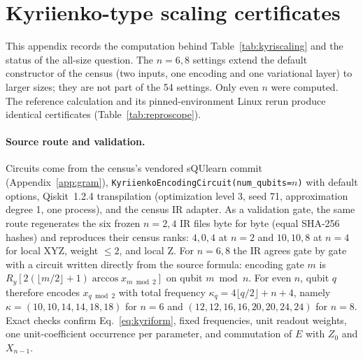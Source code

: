 \section{Kyriienko-type scaling certificates}
\label{app:kyriscaling}
This appendix records the computation behind
Table~\ref{tab:kyriscaling} and the status of the all-size question.
The $n=6,8$ settings extend the default constructor of the census
(two inputs, one encoding and one variational layer) to larger sizes;
they are not part of the 54 settings. Only even $n$ were computed.
The reference calculation and its pinned-environment Linux rerun
produce identical certificates (Table~\ref{tab:reproscope}).

\paragraph{Source route and validation.}
Circuits come from the census's vendored sQUlearn commit
(Appendix~\ref{app:gram}),
\texttt{KyriienkoEncodingCircuit(num\_qubits=$n$)} with default
options, Qiskit~1.2.4 transpilation (optimization level 3, seed 71,
approximation degree 1, one process), and the census IR adapter.
As a validation gate, the same route regenerates the six frozen
$n=2,4$ IR files byte for byte (equal SHA-256 hashes) and reproduces
their census ranks: $4,0,4$ at $n=2$ and $10,10,8$ at $n=4$ for local
XYZ, weight $\le2$, and local Z. For $n=6,8$ the IR agrees gate by
gate with a circuit written directly from the source formula: encoding
gate $m$ is $R_y[2(\lfloor m/2\rfloor+1)\arccos x_{m\bmod2}]$ on qubit
$m\bmod n$. For even $n$, qubit $q$ therefore encodes $x_{q\bmod2}$
with total frequency $\kappa_q=4\lfloor q/2\rfloor+n+4$, namely
$\kappa=(10,10,14,14,18,18)$ for $n=6$ and
$(12,12,16,16,20,20,24,24)$ for $n=8$. Exact checks confirm
Eq.~\eqref{eq:kyriform}, fixed frequencies, unit readout weights, one
unit-coefficient occurrence per parameter, and commutation of $E$ with
$Z_0$ and $X_{n-1}$.

